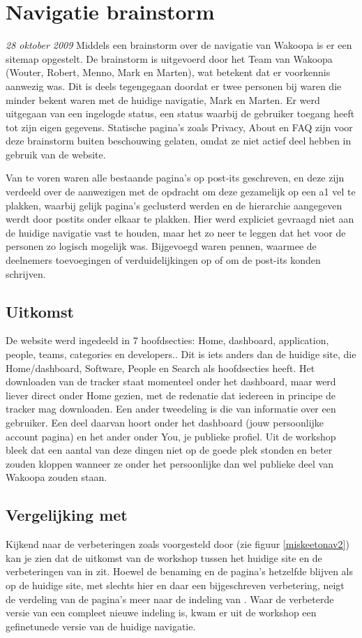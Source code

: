 \chapter{Navigatie brainstorm}
    \label{navigationappendix}
\textit{28 oktober 2009} Middels een brainstorm over de navigatie van Wakoopa is er een sitemap opgestelt. De brainstorm is uitgevoerd door het Team van Wakoopa (Wouter, Robert, Menno, Mark en Marten), wat betekent dat er voorkennis aanwezig was. Dit is deels tegengegaan doordat er twee personen bij waren die minder bekent waren met de huidige navigatie, Mark en Marten. Er werd uitgegaan van een ingelogde status, een status waarbij de gebruiker toegang heeft tot zijn eigen gegevens. Statische pagina's zoals Privacy, About en FAQ zijn voor deze brainstorm buiten beschouwing gelaten, omdat ze niet actief deel hebben in gebruik van de website.

Van te voren waren alle bestaande pagina's op post-its geschreven, en deze zijn verdeeld over de aanwezigen met de opdracht om deze gezamelijk op een a1 vel te plakken, waarbij gelijk pagina's geclusterd werden en de hierarchie aangegeven werdt door postits onder elkaar te plakken. Hier werd expliciet gevraagd niet aan de huidige navigatie vast te houden, maar het zo neer te leggen dat het voor de personen zo logisch mogelijk was. Bijgevoegd waren pennen, waarmee de deelnemers toevoegingen of verduidelijkingen op of om de post-its konden schrijven.

\section*{Uitkomst}
De website werd ingedeeld in 7 hoofdsecties: Home, dashboard, application, people, teams, categories en developers.. Dit is iets anders dan de huidige site, die Home/dashboard, Software, People en Search als hoofdsecties heeft. Het downloaden van de tracker staat momenteel onder het dashboard, maar werd liever direct onder Home gezien, met de redenatie dat iedereen in principe de tracker mag downloaden. Een ander tweedeling is die van informatie over een gebruiker. Een deel daarvan hoort onder het dashboard (jouw persoonlijke account pagina) en het ander onder You, je publieke profiel. Uit de workshop bleek dat een aantal van deze dingen niet op de goede plek stonden en beter zouden kloppen wanneer ze onder het persoonlijke dan wel publieke deel van Wakoopa zouden staan.
\section*{Vergelijking met \citeauthor{Hoekman2008}}
Kijkend naar de verbeteringen zoals voorgesteld door \citeauthor{Hoekman2008} (zie figuur \ref{miskeetonav2}) kan je zien dat de uitkomst van de workshop tussen het huidige site en de verbeteringen van \citeauthor{Hoekman2008} in zit. Hoewel de benaming en de pagina's hetzelfde blijven als op de huidige site, met slechts hier en daar een bijgeschreven verbetering, neigt de verdeling van de pagina's meer naar de indeling van \citeauthor{Hoekman2008}. Waar de verbeterde versie van \citeauthor{Hoekman2008} een compleet nieuwe indeling is, kwam er uit de workshop een gefinetunede versie van de huidige navigatie.

